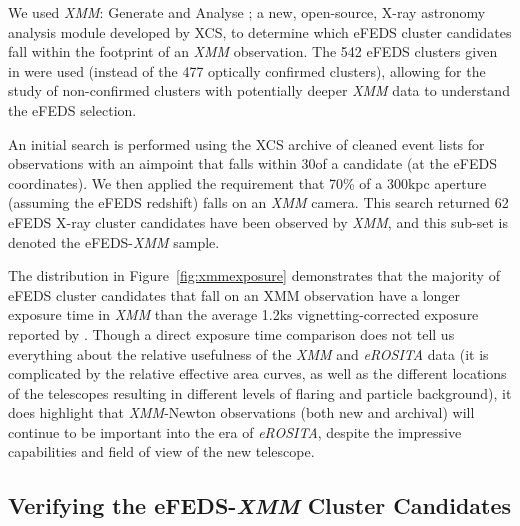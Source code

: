 \documentclass[fleqn,usenatbib]{mnras}
\begin{document}
We used {\em XMM}: Generate and Analyse \citep[\texttt{XGA}\footnote{\href{https://github.com/DavidT3/XGA}{{\em XMM}: Generate and Analyse GitHub}}][]{xgapaper}; a new, open-source, X-ray astronomy analysis module developed by XCS, to determine which eFEDS cluster candidates fall within the footprint of an {\em XMM} observation. The 542 eFEDS clusters given in \cite{efedsclustercat} were used (instead of the 477 optically confirmed clusters), allowing for the study of non-confirmed clusters with potentially deeper {\em XMM} data to understand the eFEDS selection.

An initial search is performed using the XCS archive of cleaned event lists for observations with an aimpoint that falls within 30\arcmin of a candidate (at the eFEDS coordinates). We then applied the requirement that 70\% of a 300kpc aperture (assuming the eFEDS redshift) falls on an {\em XMM} camera.  This search returned 62 eFEDS X-ray cluster candidates have been observed by {\em XMM}, and this sub-set is denoted the eFEDS-{\em XMM} sample.


The distribution in Figure~\ref{fig:xmmexposure} demonstrates that the majority of eFEDS cluster candidates that fall on an XMM observation have a longer exposure time in {\em XMM} than the average 1.2ks vignetting-corrected exposure reported by \cite{efedsclustercat}. Though a direct exposure time comparison does not tell us everything about the relative usefulness of the {\em XMM} and {\em eROSITA} data (it is complicated by the relative effective area curves, as well as the different locations of the telescopes resulting in different levels of flaring and particle background), it does highlight that {\em XMM}-Newton observations (both new and archival) will continue to be important into the era of {\em eROSITA}, despite the impressive capabilities and field of view of the new telescope. 


\subsection{Verifying the eFEDS-{\em XMM} Cluster Candidates}
\label{sec:efeds-varification}
\end{document}

